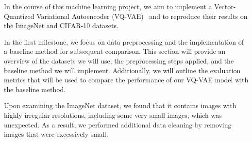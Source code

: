
In the course of this machine learning project, we aim to implement a Vector-Quantized Variational Autoencoder (VQ-VAE)~\cite{vqvae} and to reproduce their results on the ImageNet and CIFAR-10 datasets.

In the first milestone, we focus on data preprocessing and the implementation of a baseline method for subsequent comparison.
This section will provide an overview of the datasets we will use, the preprocessing steps applied, and the baseline method we will implement. Additionally, we will outline the evaluation metrics that will be used to compare the performance of our VQ-VAE model with the baseline method.

Upon examining the ImageNet dataset, we found that it contains images with highly irregular resolutions, including some very small images, which was unexpected.
As a result, we performed additional data cleaning by removing images that were excessively small.